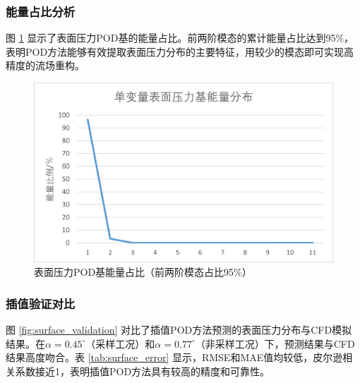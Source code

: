 \subsubsection{能量占比分析}

图 \ref{fig:surface_energy} 显示了表面压力POD基的能量占比。前两阶模态的累计能量占比达到95\%，表明POD方法能够有效提取表面压力分布的主要特征，用较少的模态即可实现高精度的流场重构。

\begin{figure}[H]
    \centering
    \includegraphics[width=0.8\linewidth]{image/基能量分布/单变量表面压力基能量分布.png}
    \caption{\songti 表面压力POD基能量占比（前两阶模态占比95\%）}
    \label{fig:surface_energy}
\end{figure}

\subsubsection{插值验证对比}

图 \ref{fig:surface_validation} 对比了插值POD方法预测的表面压力分布与CFD模拟结果。在$\alpha=0.45^\circ$（采样工况）和$\alpha=0.77^\circ$（非采样工况）下，预测结果与CFD结果高度吻合。表 \ref{tab:surface_error} 显示，RMSE和MAE值均较低，皮尔逊相关系数接近1，表明插值POD方法具有较高的精度和可靠性。


